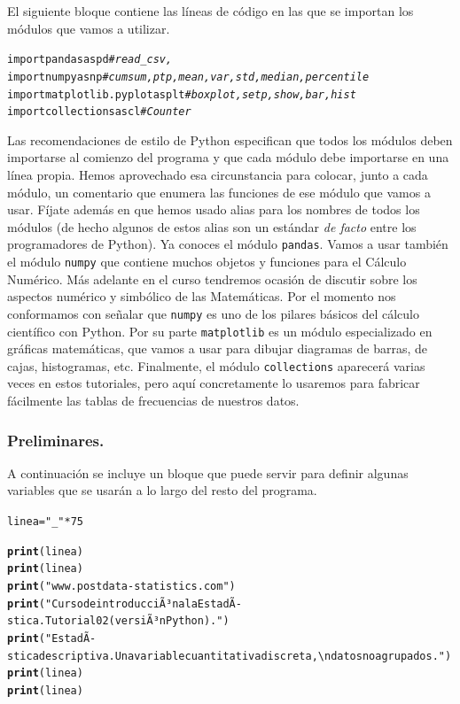 \documentclass[10pt,a4paper]{article}\usepackage[]{graphicx}\usepackage[]{color}
\makeatletter
\newcommand{\hlnum}[1]{\textcolor[rgb]{0.686,0.059,0.569}{#1}}%
\newcommand{\hlstr}[1]{\textcolor[rgb]{0.192,0.494,0.8}{#1}}%
\newcommand{\hlcom}[1]{\textcolor[rgb]{0.678,0.584,0.686}{\textit{#1}}}%
\newcommand{\hlopt}[1]{\textcolor[rgb]{0,0,0}{#1}}%
\newcommand{\hlstd}[1]{\textcolor[rgb]{0.345,0.345,0.345}{#1}}%
\newcommand{\hlkwb}[1]{\textcolor[rgb]{0.69,0.353,0.396}{#1}}%
\newcommand{\hlkwd}[1]{\textcolor[rgb]{0.737,0.353,0.396}{\textbf{#1}}}%
\newenvironment{kframe}{%
 \def\at@end@of@kframe{}%
 \ifinner\ifhmode%
  \def\at@end@of@kframe{\end{minipage}}%
  \begin{minipage}{\columnwidth}%
 \fi\fi%
 \def\FrameCommand##1{\hskip\@totalleftmargin \hskip-\fboxsep
 \colorbox{shadecolor}{##1}\hskip-\fboxsep
     \hskip-\linewidth \hskip-\@totalleftmargin \hskip\columnwidth}%
 \MakeFramed {\advance\hsize-\width
   \@totalleftmargin\z@ \linewidth\hsize
   \@setminipage}}%
 {\par\unskip\endMakeFramed%
 \at@end@of@kframe}
\newenvironment{knitrout}{}{} %
\newcounter {cont01}
\makeatother
\begin{document}
El siguiente bloque contiene las líneas de código en las que se importan los módulos que vamos a utilizar.
\begin{knitrout}
\color{fgcolor}\begin{kframe}
\begin{alltt}
import pandas as pd \hlcom{# read_csv, }
import numpy as np \hlcom{# cumsum, ptp, mean, var, std, median, percentile}
import matplotlib.pyplot as plt \hlcom{# boxplot, setp, show, bar, hist}
import collections as cl \hlcom{# Counter}
\end{alltt}
\end{kframe}
\end{knitrout}
Las recomendaciones de estilo de Python especifican que todos los módulos deben importarse al comienzo del programa y que cada módulo debe importarse en una línea propia. Hemos aprovechado esa circunstancia para colocar, junto a cada módulo, un comentario que enumera las funciones de ese módulo que vamos a usar. Fíjate además en que hemos usado alias para los nombres de todos los módulos (de hecho algunos de estos alias son un estándar {\em de facto} entre los programadores de Python). Ya conoces el módulo {\tt pandas}. Vamos a usar también el módulo {\tt numpy} que contiene muchos objetos y funciones para el Cálculo Numérico. Más adelante en el curso tendremos ocasión de discutir sobre los aspectos numérico y simbólico de las Matemáticas. Por el momento nos conformamos con señalar que {\tt numpy} es uno de los pilares básicos del cálculo científico con Python. Por su parte {\tt matplotlib} es un módulo especializado en gráficas matemáticas, que vamos a usar para dibujar diagramas de barras, de cajas, histogramas, etc. Finalmente, el módulo {\tt collections} aparecerá varias veces en estos tutoriales, pero aquí concretamente lo usaremos para fabricar fácilmente las tablas de frecuencias de nuestros datos.


\subsubsection*{Preliminares.}
\label{tut02:subsubsec:preliminares}

A continuación se incluye un bloque que puede servir para definir algunas variables que se usarán a lo largo del resto del programa.
\begin{knitrout}
\color{fgcolor}\begin{kframe}
\begin{alltt}
\hlstd{linea} \hlkwb{=} \hlstr{"_"} \hlopt{*} \hlnum{75}

\hlkwd{print}\hlstd{(linea)}
\hlkwd{print}\hlstd{(linea)}
\hlkwd{print}\hlstd{(}\hlstr{"www.postdata-statistics.com"}\hlstd{)}
\hlkwd{print}\hlstd{(}\hlstr{"Curso de introducciÃ³n a la EstadÃ­stica. Tutorial02 (versiÃ³n Python)."}\hlstd{)}
\hlkwd{print}\hlstd{(}\hlstr{"EstadÃ­stica descriptiva. Una variable cuantitativa discreta,\textbackslash{}n datos no agrupados."}\hlstd{)}
\hlkwd{print}\hlstd{(linea)}
\hlkwd{print}\hlstd{(linea)}
\end{alltt}
\end{kframe}
\end{knitrout}
\end{document}
